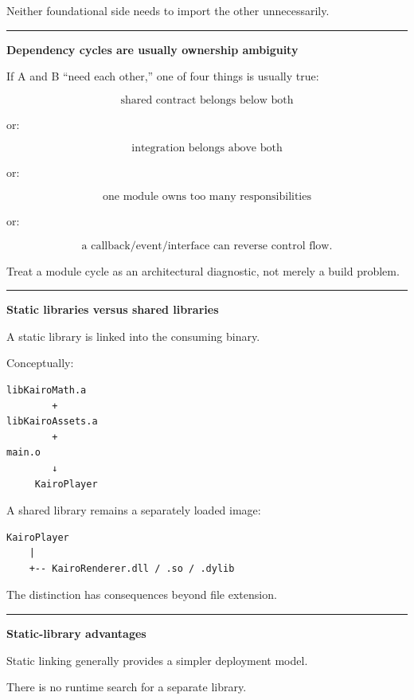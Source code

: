 Neither foundational side needs to import the other unnecessarily.

\begin{center}\rule{0.5\linewidth}{0.5pt}\end{center}

\textbf{Dependency cycles are usually ownership ambiguity}

If A and B ``need each other,'' one of four things is usually true:

\[
\text{shared contract belongs below both}
\]

or:

\[
\text{integration belongs above both}
\]

or:

\[
\text{one module owns too many responsibilities}
\]

or:

\[
\text{a callback/event/interface can reverse control flow}.
\]

Treat a module cycle as an architectural diagnostic, not merely a build problem.

\begin{center}\rule{0.5\linewidth}{0.5pt}\end{center}

\textbf{Static libraries versus shared libraries}

A static library is linked into the consuming binary.

Conceptually:

\begin{verbatim}
libKairoMath.a
        +
libKairoAssets.a
        +
main.o
        ↓
     KairoPlayer
\end{verbatim}

A shared library remains a separately loaded image:

\begin{verbatim}
KairoPlayer
    |
    +-- KairoRenderer.dll / .so / .dylib
\end{verbatim}

The distinction has consequences beyond file extension.

\begin{center}\rule{0.5\linewidth}{0.5pt}\end{center}

\textbf{Static-library advantages}

Static linking generally provides a simpler deployment model.

There is no runtime search for a separate library.

